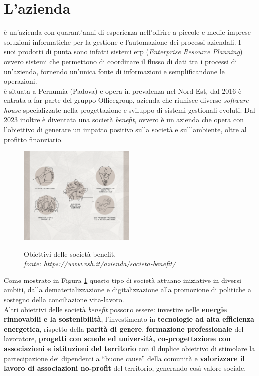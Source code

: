 \section{L'azienda}
{\company} è un'azienda con quarant'anni di esperienza nell'offrire a piccole e medie imprese soluzioni informatiche per la 
gestione e l'automazione dei processi aziendali. I suoi prodotti di punta sono infatti sistemi \gls{erp} (\textit{Enterprise 
Resource Planning}) ovvero sistemi che permettono di coordinare il flusso di dati tra i processi di un'azienda, fornendo un'unica fonte di 
informazioni e semplificandone le operazioni.\\
{\company} è situata a Pernumia (Padova) e opera in prevalenza nel Nord Est, dal 2016 è entrata a far parte del gruppo Officegroup, azienda 
che riunisce diverse \textit{software house} specializzate nella progettazione e sviluppo di sistemi gestionali evoluti. 
Dal 2023 inoltre è diventata una società \textit{benefit}, ovvero è un azienda che opera con l'obiettivo di generare un impatto positivo 
sulla società e sull'ambiente, oltre al profitto finanziario.

\begin{figure}[H]
    \centering
    \includegraphics[alt={Obiettivi delle società benefit}, width=0.5\textwidth]{img/soc-benefit.png}
    \caption[Obiettivi delle società benefit.]{Obiettivi delle società benefit. \\ \textit{fonte: https://www.vsh.it/azienda/societa-benefit/}}
    \label{fig:società benefit}
\end{figure}

Come mostrato in Figura \ref{fig:società benefit} questo tipo di società attuano iniziative in diversi ambiti, dalla dematerializzazione 
e digitalizzazione alla promozione di politiche a sostegno della conciliazione vita-lavoro.\\
Altri obiettivi delle società \textit{benefit} possono essere: investire nelle \textbf{energie rinnovabili e la sostenibilità}, l'investimento in \textbf{tecnologie 
ad alta efficienza energetica}, rispetto della \textbf{parità di genere}, \textbf{formazione professionale} del lavoratore, \textbf{progetti con scuole ed 
università, co-progettazione con associazioni e istituzioni del territorio} con il duplice obiettivo di stimolare la partecipazione dei dipendenti 
a “buone cause” della comunità e \textbf{valorizzare il lavoro di associazioni no-profit} del territorio, generando così valore sociale.

